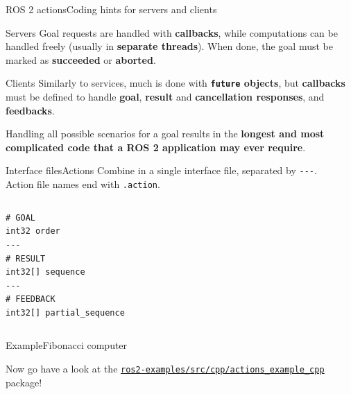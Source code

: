 \begin{frame}{ROS 2 actions}{Coding hints for servers and clients}
  \begin{block}{Servers}
    Goal requests are handled with \textbf{callbacks}, while computations can be handled freely (usually in \textbf{separate threads}). When done, the goal must be marked as \textbf{succeeded} or \textbf{aborted}.
  \end{block}
  \begin{block}{Clients}
    Similarly to services, much is done with \textbf{\texttt{future} objects}, but \textbf{callbacks} must be defined to handle \textbf{goal}, \textbf{result} and \textbf{cancellation responses}, and \textbf{feedbacks}.
  \end{block}
  \begin{block}{}
    \centering
    Handling all possible scenarios for a goal results in the \textbf{longest and most complicated code that a ROS 2 application may ever require}. {\Large\smiley{}}
  \end{block}
\end{frame}

\begin{frame}[fragile]{Interface files}{Actions}
  Combine  in a single interface file, separated by \texttt{-{}-{}-}.\\
  Action file names end with \texttt{.action}.
  \begin{columns}
  \begin{lstlisting}[language=ros2msg, caption=Definition of the \texttt{ros2\_examples\_interfaces/action/Fibonacci} action.]
# GOAL
int32 order
---
# RESULT
int32[] sequence
---
# FEEDBACK
int32[] partial_sequence\end{lstlisting}
  \end{columns}
\end{frame}

\begin{frame}{Example}{Fibonacci computer}
  \begin{block}{}
    \centering
    Now go have a look at the \href{https://github.com/IntelligentSystemsLabUTV/ros2-examples/tree/humble/src/cpp/actions_example_cpp}{\color{blue}\underline{\texttt{ros2-examples/src/cpp/actions\_example\_cpp}}} package!
  \end{block}
\end{frame}
